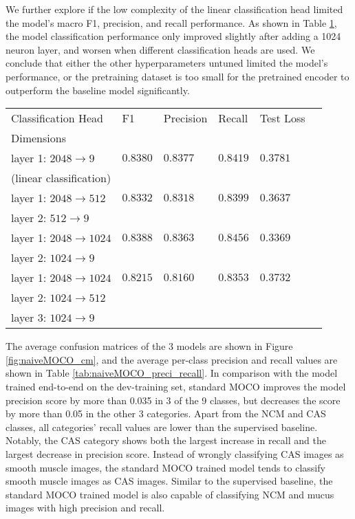 \documentclass[12pt,twoside]{report}
\begin{document}
We further explore if the low complexity of the linear classification head limited the model's macro F1, precision, and recall performance. As shown in Table \ref{tab:MOCO_multimlp}, the model classification performance only improved slightly after adding a 1024 neuron layer, and worsen when different classification heads are used. We conclude that either the other hyperparameters untuned limited the model's performance, or the pretraining dataset is too small for the pretrained encoder to outperform the baseline model significantly. \\


\begin{table}[]
    \centering
    \begin{tabular}{llllll}
    \toprule
    Classification Head & F1 & Precision & Recall & Test Loss \\
    Dimensions & & & & \\
    \midrule
    layer 1: $2048 \to 9$ & $0.8380$ & $0.8377$ & $0.8419$ & $0.3781$\\
    (linear classification)\\
    \midrule
    layer 1: $2048 \to 512$ & $0.8332$ & $0.8318$ & $0.8399$ & $0.3637$ \\
    layer 2: $512 \to 9$ \\
    \midrule
    layer 1: $2048 \to 1024$ & $0.8388$ & $0.8363$ & $0.8456$ & $0.3369$\\
    layer 2: $1024 \to 9$ \\
    \midrule
    layer 1: $2048 \to 1024$ & $0.8215$ & $0.8160$ & $0.8353$ & $0.3732$\\
    layer 2: $1024 \to 512$ \\
    layer 3: $1024 \to 9$ \\
    \bottomrule
    \end{tabular}
    \captionsetup{type=table}
    \label{tab:MOCO_multimlp}
\end{table}


The average confusion matrices of the 3 models are shown in Figure \ref{fig:naiveMOCO_cm}, and the average per-class precision and recall values are shown in Table \ref{tab:naiveMOCO_preci_recall}. In comparison with the model trained end-to-end on the dev-training set, standard MOCO improves the model precision score by more than 0.035 in 3 of the 9 classes, but decreases the score by more than 0.05 in the other 3 categories. Apart from the NCM and CAS classes, all categories' recall values are lower than the supervised baseline. Notably, the CAS category shows both the largest increase in recall and the largest decrease in precision score. Instead of wrongly classifying CAS images as smooth muscle images, the standard MOCO trained model tends to classify smooth muscle images as CAS images. Similar to the supervised baseline, the standard MOCO trained model is also capable of classifying NCM and mucus images with high precision and recall. \\ 
\end{document}
